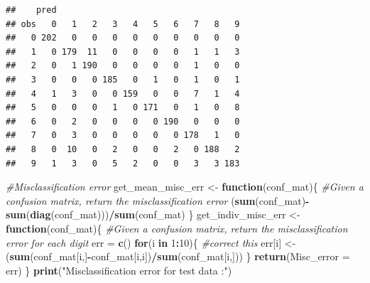 \documentclass[
]{article}
\newenvironment{Shaded}{\begin{snugshade}}{\end{snugshade}}
\newcommand{\AttributeTok}[1]{\textcolor[rgb]{0.13,0.29,0.53}{#1}}
\newcommand{\CommentTok}[1]{\textcolor[rgb]{0.56,0.35,0.01}{\textit{#1}}}
\newcommand{\ControlFlowTok}[1]{\textcolor[rgb]{0.13,0.29,0.53}{\textbf{#1}}}
\newcommand{\DecValTok}[1]{\textcolor[rgb]{0.00,0.00,0.81}{#1}}
\newcommand{\FunctionTok}[1]{\textcolor[rgb]{0.13,0.29,0.53}{\textbf{#1}}}
\newcommand{\NormalTok}[1]{#1}
\newcommand{\OtherTok}[1]{\textcolor[rgb]{0.56,0.35,0.01}{#1}}
\newcommand{\SpecialCharTok}[1]{\textcolor[rgb]{0.81,0.36,0.00}{\textbf{#1}}}
\newcommand{\StringTok}[1]{\textcolor[rgb]{0.31,0.60,0.02}{#1}}
\begin{document}
\begin{Shaded}
\end{Shaded}

\begin{verbatim}
##    pred
## obs   0   1   2   3   4   5   6   7   8   9
##   0 202   0   0   0   0   0   0   0   0   0
##   1   0 179  11   0   0   0   0   1   1   3
##   2   0   1 190   0   0   0   0   1   0   0
##   3   0   0   0 185   0   1   0   1   0   1
##   4   1   3   0   0 159   0   0   7   1   4
##   5   0   0   0   1   0 171   0   1   0   8
##   6   0   2   0   0   0   0 190   0   0   0
##   7   0   3   0   0   0   0   0 178   1   0
##   8   0  10   0   2   0   0   2   0 188   2
##   9   1   3   0   5   2   0   0   3   3 183
\end{verbatim}

\begin{Shaded}
\begin{Highlighting}[]
\CommentTok{\#Misclassification error}
\NormalTok{get\_mean\_misc\_err }\OtherTok{\textless{}{-}} \ControlFlowTok{function}\NormalTok{(conf\_mat)\{}
  \CommentTok{\#Given a confusion matrix, return the misclassification error}
\NormalTok{  (}\FunctionTok{sum}\NormalTok{(conf\_mat)}\SpecialCharTok{{-}}\FunctionTok{sum}\NormalTok{(}\FunctionTok{diag}\NormalTok{(conf\_mat)))}\SpecialCharTok{/}\FunctionTok{sum}\NormalTok{(conf\_mat)}
\NormalTok{\}}
\NormalTok{get\_indiv\_misc\_err }\OtherTok{\textless{}{-}} \ControlFlowTok{function}\NormalTok{(conf\_mat)\{}
  \CommentTok{\#Given a confusion matrix, return the misclassification error for each digit}
\NormalTok{  err }\OtherTok{=} \FunctionTok{c}\NormalTok{()}
  \ControlFlowTok{for}\NormalTok{(i }\ControlFlowTok{in} \DecValTok{1}\SpecialCharTok{:}\DecValTok{10}\NormalTok{)\{}
    \CommentTok{\#correct this}
\NormalTok{    err[i] }\OtherTok{\textless{}{-}}\NormalTok{ (}\FunctionTok{sum}\NormalTok{(conf\_mat[i,]}\SpecialCharTok{{-}}\NormalTok{conf\_mat[i,i])}\SpecialCharTok{/}\FunctionTok{sum}\NormalTok{(conf\_mat[i,]))}
\NormalTok{  \}}
  \FunctionTok{return}\NormalTok{(}\AttributeTok{Misc\_error =}\NormalTok{ err)}
\NormalTok{\}}
\FunctionTok{print}\NormalTok{(}\StringTok{"Misclassification error for test data :"}\NormalTok{)}
\end{Highlighting}
\end{Shaded}
\end{document}
